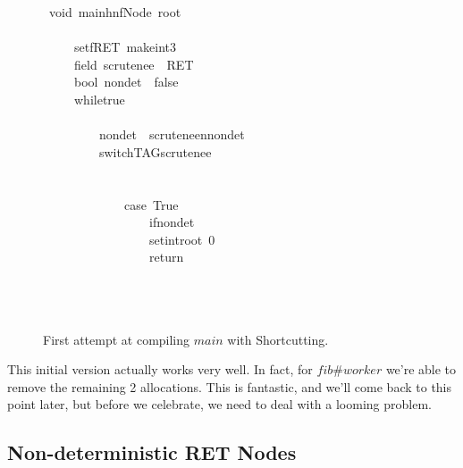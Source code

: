 \documentclass{book}
\theoremstyle{definition}
\newcommand{\Varid}[1]{\mathit{#1}}
\begin{document}
\begin{figure}
\begin{tabbing}\ttfamily
~void~mainhnfNode~root\\
\ttfamily ~\\
\ttfamily ~~~~~setfRET~makeint3\\
\ttfamily ~~~~~field~scrutenee~~RET\\
\ttfamily ~~~~~bool~nondet~~false\\
\ttfamily ~~~~~whiletrue\\
\ttfamily ~~~~~\\
\ttfamily ~~~~~~~~~nondet~~scruteneennondet\\
\ttfamily ~~~~~~~~~switchTAGscrutenee\\
\ttfamily ~~~~~~~~~\\
\ttfamily ~~~~~~~~~~~~~\\
\ttfamily ~~~~~~~~~~~~~case~True\\
\ttfamily ~~~~~~~~~~~~~~~~~ifnondet~\\
\ttfamily ~~~~~~~~~~~~~~~~~setintroot~0\\
\ttfamily ~~~~~~~~~~~~~~~~~return\\
\ttfamily ~~~~~~~~~~~~~\\
\ttfamily ~~~~~~~~~\\
\ttfamily ~~~~~
\end{tabbing}
\caption{First attempt at compiling \ensuremath{\Varid{main}} with Shortcutting.}
\label{fig:RET1}
\end{figure}

This initial version actually works very well.
In fact, for \ensuremath{\Varid{fib}\#\Varid{worker}} we're able to remove the remaining 2 allocations.
This is fantastic, and we'll come back to this point later,
but before we celebrate, we need to deal with a looming problem.

\subsection{Non-deterministic RET Nodes}
\end{document}
